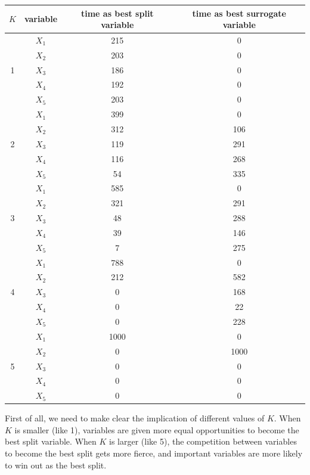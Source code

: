 \documentclass[paper=letter, fontsize=12pt]{article}
\begin{document}
\begin{enumerate}[label=(\alph*)]
\begin{enumerate}[label=(\roman*)]
		\begin{center}
			\begin{longtable}{|c|c|c|c|}
				\hline
				$K$ & variable & time as best split variable  & time as best surrogate variable \\ \hline
				\multirow{5}{1em}{1} & $X_1$ & 215 & 0 \\ 
				& $X_2$ & 203 & 0\\
				& $X_3$ & 186 & 0\\
				& $X_4$ & 192 & 0\\
				& $X_5$ & 203 & 0\\
				\hline
				\multirow{5}{1em}{2} & $X_1$ & 399 & 0\\ 
				& $X_2$ & 312 & 106\\
				& $X_3$ & 119 & 291\\
				& $X_4$ & 116 & 268\\
				& $X_5$ & 54 & 335\\
				\hline
				\multirow{5}{1em}{3} & $X_1$ & 585 & 0 \\ 
				& $X_2$ & 321 & 291\\
				& $X_3$ & 48 & 288\\
				& $X_4$ & 39 & 146\\
				& $X_5$ & 7 & 275\\
				\hline
				\multirow{5}{1em}{4} & $X_1$ & 788 & 0\\ 
				& $X_2$ & 212 & 582\\
				& $X_3$ & 0 & 168\\
				& $X_4$ & 0 & 22\\
				& $X_5$ & 0 & 228\\
				\hline
				\multirow{5}{1em}{5} & $X_1$ & 1000 & 0\\ 
				& $X_2$ & 0 & 1000\\
				& $X_3$ & 0 & 0\\
				& $X_4$ & 0 & 0\\
				& $X_5$ & 0 & 0\\
				\hline
			\end{longtable}
		\end{center}	
	
		First of all, we need to make clear the implication of different values of $K$. When $K$ is smaller (like 1), variables are given more equal opportunities to become the best split variable. When $K$ is larger (like 5), the competition between variables to become the best split gets more fierce, and important variables are more likely to win out as the best split.
	

\end{enumerate}
\end{enumerate}
\end{document}
